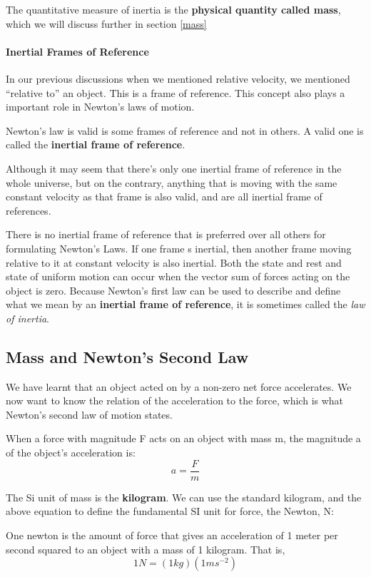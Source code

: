 The quantitative measure of inertia is the \textbf{physical quantity called mass}, which we will discuss further in section \ref{mass}

\paragraph{Inertial Frames of Reference} \label{ifor}
In our previous discussions when we mentioned relative velocity, we mentioned ``relative to'' an object. This is a frame of reference. This concept also plays a important role in Newton's laws of motion.

Newton's law is valid is some frames of reference and not in others. A valid one is called the \textbf{inertial frame of reference}. 

Although it may seem that there's only one inertial frame of reference in the whole universe, but on the contrary, anything that is moving with the same constant velocity as that frame is also valid, and are all inertial frame of references.

There is no inertial frame of reference that is preferred over all others for formulating Newton's Laws. If one frame s inertial, then another frame moving relative to it at constant velocity is also inertial. Both the state and rest and state of uniform motion can occur when the vector sum of forces acting on the object is zero. Because Newton's first law can be used to describe and define what we mean by an \textbf{inertial frame of reference}, it is sometimes called the \emph{law of inertia}.

\subsection{Mass and Newton's Second Law}
We have learnt that an object acted on by a non-zero net force accelerates. We now want to know the relation of the acceleration to the force, which is what Newton's second law of motion states.

When a force with magnitude F acts on an object with mass m, the magnitude a of the object's acceleration is:
$$a=\frac{F}{m}$$

The Si unit of mass is the \textbf{kilogram}\label{mass}. We can use the standard kilogram, and the above equation to define the fundamental SI unit for force, the Newton, N\label{newton}:

\begin{defi} 
One newton is the amount of force that gives an acceleration of 1 meter per second squared to an object with a mass of 1 kilogram. That is,
$$1 N = (1kg) (1ms^{-2})$$
\end{defi}

